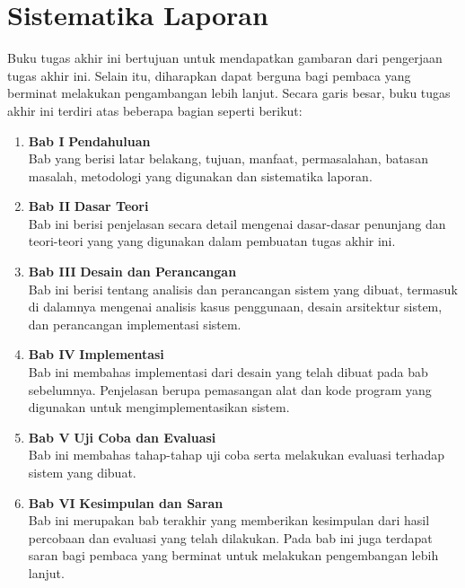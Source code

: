 \section{Sistematika Laporan}
Buku tugas akhir ini bertujuan untuk mendapatkan gambaran dari pengerjaan tugas akhir ini. Selain itu, diharapkan dapat berguna bagi pembaca yang berminat melakukan pengambangan lebih lanjut. Secara garis besar, buku tugas akhir ini terdiri atas beberapa bagian seperti berikut:
\begin{enumerate}

\item \textbf{Bab I} \indent \textbf{Pendahuluan} \\        
\indent \indent Bab yang berisi latar belakang, tujuan, manfaat, permasalahan, batasan masalah, metodologi yang digunakan dan sistematika laporan.
\\
\item \textbf{Bab II} \indent \textbf{Dasar Teori}
\\
\indent \indent Bab ini berisi penjelasan secara detail mengenai dasar-dasar penunjang dan teori-teori yang yang digunakan dalam pembuatan tugas akhir ini.
\\
\item \textbf{Bab III} \indent \textbf{Desain dan Perancangan}
\\
\indent \indent Bab ini berisi tentang analisis dan perancangan sistem yang dibuat, termasuk di dalamnya mengenai analisis kasus penggunaan, desain arsitektur sistem, dan perancangan implementasi sistem.
\\
\item \textbf{Bab IV} \indent \textbf{Implementasi}
\\
\indent \indent Bab ini membahas implementasi dari desain yang telah dibuat pada bab sebelumnya. Penjelasan berupa pemasangan alat dan kode program yang digunakan untuk mengimplementasikan sistem.
\\
\item \textbf{Bab V} \indent \textbf{Uji Coba dan Evaluasi}
\\
\indent \indent Bab ini membahas tahap-tahap uji coba serta melakukan evaluasi terhadap sistem yang dibuat.
\\
\item \textbf{Bab VI} \indent \textbf{Kesimpulan dan Saran}
\\
\indent \indent Bab ini merupakan bab terakhir yang memberikan kesimpulan dari hasil percobaan dan evaluasi yang telah dilakukan. Pada bab ini juga terdapat saran bagi pembaca yang berminat untuk melakukan pengembangan lebih lanjut.    
\end{enumerate}